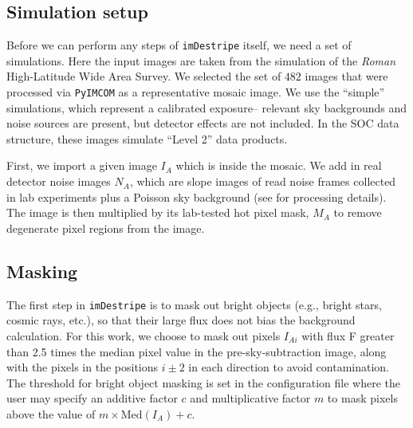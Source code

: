 \documentclass[]{pasj01}
\newcommand{\Chris}[1]{{\textcolor{red}{\bfseries{[#1]}}}}
\begin{document}

\subsection{Simulation setup}

Before we can perform any steps of {\tt imDestripe} itself, we need a set of simulations. Here the input images are taken from the \citet{OpenUniverse2025} simulation of the \textit{Roman} High-Latitude Wide Area Survey. We selected the set of $482$ images that were processed via {\tt PyIMCOM} as a representative mosaic image. We use the ``simple'' simulations, which represent a calibrated exposure-- relevant sky backgrounds and noise sources are present, but detector effects are not included. In the SOC data structure, these images simulate ``Level 2'' data products.

First, we import a given image $I_A$ which is inside the mosaic. We add in real detector noise images $N_A$, which are slope images of read noise frames collected in lab experiments plus a Poisson sky background (see \cite{Laliotis2024} for processing details). The image is then multiplied by its lab-tested hot pixel mask, $M_A$ to remove degenerate pixel regions from the image. 

\subsection{Masking}

The first step in \texttt{imDestripe} is to mask out bright objects (e.g., bright stars, cosmic rays, etc.), so that their large flux does not bias the background calculation. For this work, we choose to mask out pixels $I_{Ai}$ with flux F greater than 2.5 times the median pixel value in the pre-sky-subtraction image, along with the pixels in the positions $i\pm2$ in each direction to avoid contamination. The threshold for bright object masking is set in the configuration file where the user may specify an additive factor $c$ and multiplicative factor $m$ to mask pixels above the value of $m\times \text{Med}(I_{A})+c$.

\end{document}
